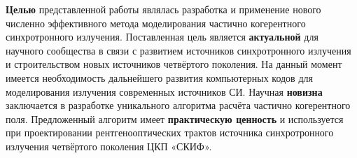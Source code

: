 
\textbf{Целью} представленной работы являлась разработка и применение нового численно эффективного метода моделирования частично когерентного синхротронного излучения. Поставленная цель является \textbf{актуальной} для научного сообщества в связи с развитием источников синхротронного излучения и строительством новых источников четвёртого поколения. На данный момент имеется необходимость дальнейшего развития компьютерных кодов для моделирования излучения современных источников СИ. Научная \textbf{новизна} заключается в разработке уникального алгоритма расчёта частично когерентного поля. Предложенный алгоритм имеет \textbf{практическую ценность} и используется при проектировании рентгенооптических трактов источника синхротронного излучения четвёртого поколения ЦКП «СКИФ». 


%
%





